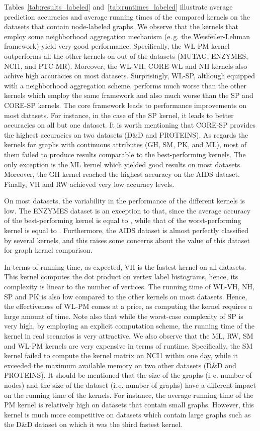 \documentclass[twoside,11pt]{article}
\newcommand{\eg}{e.\,g. }
\newcommand{\ie}{i.\,e. }
\begin{document}
Tables~\ref{tab:results_labeled} and~\ref{tab:runtimes_labeled} illustrate average prediction accuracies and average running times of the compared kernels on the datasets that contain node-labeled graphs.
We observe that the kernels that employ some neighborhood aggregation mechanism (\eg the Weisfeiler-Lehman framework) yield very good performance.
Specifically, the WL-PM kernel outperforms all the other kernels on  out of the  datasets (MUTAG, ENZYMES, NCI1, and PTC-MR).
Moreover, the WL-VH, CORE-WL and NH kernels also achive high accuracies on most datasets.
Surprisingly, WL-SP, although equipped with a neighborhood aggregation scheme, performs much worse than the other kernels which employ the same framework and also much worse than the SP and CORE-SP kernels.
The core framework leads to performance improvements on most datasets.
For instance, in the case of the SP kernel, it leads to better accuracies on all but one dataset.
It is worth mentioning that CORE-SP provides the highest accuracies on two datasets (D\&D and PROTEINS).
As regards the kernels for graphs with continuous attributes (GH, SM, PK, and ML), most of them failed to produce results comparable to the best-performing kernels.
The only exception is the ML kernel which yielded good results on most datasets.
Moreover, the GH kernel reached the highest accuracy on the AIDS dataset.
Finally, VH and RW achieved very low accuracy levels.

On most datasets, the variability in the performance of the different kernels is low.
The ENZYMES dataset is an exception to that, since the average accuracy of the best-performing kernel is equal to , while that of the worst-performing kernel is equal to .
Furthermore, the AIDS dataset is almost perfectly classified by several kernels, and this raises some concerns about the value of this dataset for graph kernel comparison.

In terms of running time, as expected, VH is the fastest kernel on all datasets.
This kernel computes the dot product on vertex label histograms, hence, its complexity is linear to the number of vertices.
The running time of WL-VH, NH, SP and PK is also low compared to the other kernels on most datasets.
Hence, the effectiveness of WL-PM comes at a price, as computing the kernel requires a large amount of time.
Note also that while the worst-case complexity of SP is very high, by employing an explicit computation scheme, the running time of the kernel in real scenarios is very attractive.
We also observe that the ML, RW, SM and WL-PM kernels are very expensive in terms of runtime.
Specifically, the SM kernel failed to compute the kernel matrix on NCI1 within one day, while it exceeded the maximum available memory on two other datasets (D\&D and PROTEINS).
It should be mentioned that the size of the graphs (\ie number of nodes) and the size of the dataset (\ie number of graphs) have a different impact on the running time of the kernels.
For instance, the average running time of the PM kernel is relatively high on datasets that contain small graphs.
However, this kernel is much more competitive on datasets which contain large graphs such as the D\&D dataset on which it was the third fastest kernel.
\end{document}

